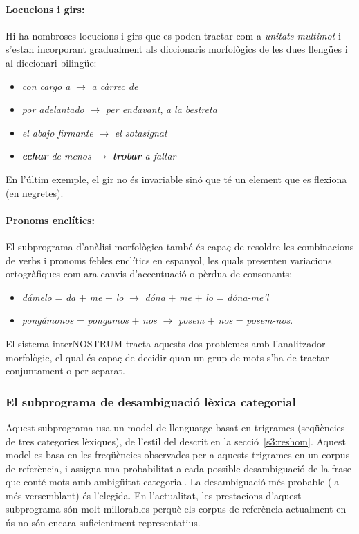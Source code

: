 \paragraph{Locucions i girs:} Hi ha nombroses locucions i girs que es poden tractar com a \emph{unitats
  multimot} i s'estan incorporant gradualment als diccionaris
morfològics de les dues llengües i al diccionari bilingüe:
\begin{itemize}
\item \emph{con cargo a} $\rightarrow$ \emph{a càrrec de}
\item \emph{por adelantado} $\rightarrow$ \emph{per endavant}, \emph{a la bestreta}
\item \emph{el abajo firmante} $\rightarrow$ \emph{el sotasignat}
\item \emph{{\bf echar} de menos} $\rightarrow$ \emph{{\bf trobar} a faltar}
\end{itemize}
En l'últim exemple, el gir no és invariable sinó que té un element que
es flexiona (en negretes).

\paragraph{Pronoms enclítics:} El subprograma d'anàlisi morfològica també és capaç de resoldre les
combinacions de verbs i pronoms febles enclítics en espanyol, les
quals presenten variacions ortogràfiques com ara canvis d'accentuació
o pèrdua de consonants:
\begin{itemize}
\item \emph{d\'{a}melo} = \emph{da} $+$ \emph{me} $+$ \emph{lo} $\rightarrow$
\emph{dóna} $+$ \emph{me} $+$ \emph{lo} = \emph{dóna-me'l}
\item \emph{pong\'{a}monos} = \emph{pongamos} $+$ \emph{nos} $\rightarrow$ {\em
posem} $+$ \emph{nos} = \emph{posem-nos}.  
\end{itemize}

El sistema interNOSTRUM tracta aquests dos problemes amb l'analitzador
morfològic, el qual és capaç de decidir quan un grup de mots s'ha de
tractar conjuntament o per separat. 

\subsubsection{El subprograma de desambiguació lèxica categorial} 

Aquest subprograma usa un model de llenguatge basat en trigrames
(se\-qüèn\-cies de tres categories lèxiques), de l'estil del descrit
en la secció~\ref{s3:reshom}. Aquest model es basa en les freqüències
observades per a aquests trigrames en un corpus de referència, i
assigna una probabilitat a cada possible desambiguació de la frase que
conté mots amb ambigüitat categorial. La desambiguació més probable
(la més versemblant) és l'elegida. En l'actualitat, les prestacions
d'aquest subprograma són molt millorables perquè els corpus de
referència actualment en ús no són encara suficientment
representatius.

